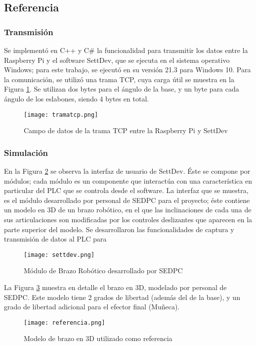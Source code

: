 \subsection{Referencia}

\subsubsection{Transmisión}

Se implementó en C++ y C\# la funcionalidad para transmitir los datos entre la Raspberry Pi y el software SettDev, que se ejecuta en el sistema operativo Windows; para este trabajo, se ejecutó en su versión 21.3 para Windows 10. Para la comunicación, se utilizó una trama TCP, cuya carga útil se muestra en la Figura \ref{fig:tramatcp}. Se utilizan dos bytes para el ángulo de la base, y un byte para cada ángulo de los eslabones, siendo 4 bytes en total.

\begin{figure}[htb]
	\centering
	\texttt{[image: tramatcp.png]}
	\caption{Campo de datos de la trama TCP entre la Raspberry Pi y SettDev}
	\label{fig:tramatcp}
\end{figure}

\subsubsection{Simulación}

En la Figura \ref{fig:settdev} se observa la interfaz de usuario de SettDev. Éste se compone por módulos; cada módulo es un componente que interactúa con una característica en particular del PLC que se controla desde el software. La interfaz que se muestra, es el módulo desarrollado por personal de SEDPC para el proyecto; éste contiene un modelo en 3D de un brazo robótico, en el que las inclinaciones de cada una de sus articulaciones son modificadas por los controles deslizantes que aparecen en la parte superior del modelo. Se desarrollaron las funcionalidades de captura y transmisión de datos al PLC para 

\begin{figure}[htb]
	\centering
	\texttt{[image: settdev.png]}
	\caption{Módulo de Brazo Robótico desarrollado por SEDPC}
	\label{fig:settdev}
\end{figure}

La Figura \ref{fig:referencia} muestra en detalle el brazo en 3D, modelado por personal de SEDPC. Este modelo tiene 2 grados de libertad (además del de la base), y un grado de libertad adicional para el efector final (Muñeca).

\begin{figure}[htb]
	\centering
	\texttt{[image: referencia.png]}
	\caption{Modelo de brazo en 3D utilizado como referencia}
	\label{fig:referencia}
\end{figure}